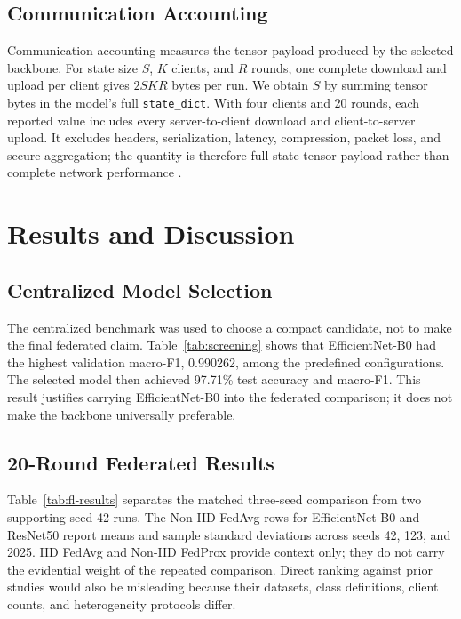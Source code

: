 \documentclass[conference]{IEEEtran}
\begin{document}
\subsection{Communication Accounting}
Communication accounting measures the tensor payload produced by the selected backbone. For state size $S$, $K$ clients, and $R$ rounds, one complete download and upload per client gives $2SKR$ bytes per run. We obtain $S$ by summing tensor bytes in the model's full \texttt{state\_dict}. With four clients and 20 rounds, each reported value includes every server-to-client download and client-to-server upload. It excludes headers, serialization, latency, compression, packet loss, and secure aggregation; the quantity is therefore full-state tensor payload rather than complete network performance \cite{radhika2026communication,zhou2022communication,das2026federated}.

\section{Results and Discussion}
\subsection{Centralized Model Selection}
The centralized benchmark was used to choose a compact candidate, not to make the final federated claim. Table~\ref{tab:screening} shows that EfficientNet-B0 had the highest validation macro-F1, 0.990262, among the predefined configurations. The selected model then achieved 97.71\% test accuracy and macro-F1. This result justifies carrying EfficientNet-B0 into the federated comparison; it does not make the backbone universally preferable.

\subsection{20-Round Federated Results}
Table~\ref{tab:fl-results} separates the matched three-seed comparison from two supporting seed-42 runs. The Non-IID FedAvg rows for EfficientNet-B0 and ResNet50 report means and sample standard deviations across seeds 42, 123, and 2025. IID FedAvg and Non-IID FedProx provide context only; they do not carry the evidential weight of the repeated comparison. Direct ranking against prior studies would also be misleading because their datasets, class definitions, client counts, and heterogeneity protocols differ.
\end{document}
